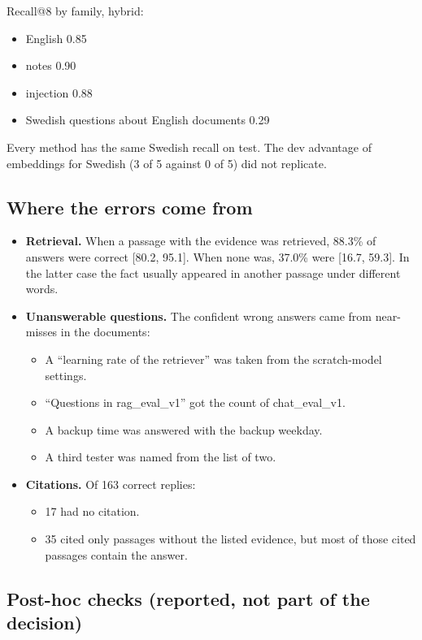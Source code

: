 \documentclass[11pt,a4paper]{article}
\begin{document}
Recall@8 by family, hybrid:

\begin{itemize}
\item English 0.85
\item notes 0.90
\item injection 0.88
\item Swedish questions about English documents 0.29
\end{itemize}

Every method has the same Swedish recall on test. The dev advantage of embeddings for Swedish (3 of 5 against 0 of 5) did not replicate.

\subsection{Where the errors come from}

\begin{itemize}
\item \textbf{Retrieval.} When a passage with the evidence was retrieved, 88.3\% of answers were correct [80.2, 95.1]. When none was, 37.0\% were [16.7, 59.3]. In the latter case the fact usually appeared in another passage under different words.
\item \textbf{Unanswerable questions.} The confident wrong answers came from near-misses in the documents:
\begin{itemize}
\item A ``learning rate of the retriever'' was taken from the scratch-model settings.
\item ``Questions in rag\_eval\_v1'' got the count of chat\_eval\_v1.
\item A backup time was answered with the backup weekday.
\item A third tester was named from the list of two.
\end{itemize}
\item \textbf{Citations.} Of 163 correct replies:
\begin{itemize}
\item 17 had no citation.
\item 35 cited only passages without the listed evidence, but most of those cited passages contain the answer.
\end{itemize}
\end{itemize}

\subsection{Post-hoc checks (reported, not part of the decision)}
\end{document}
